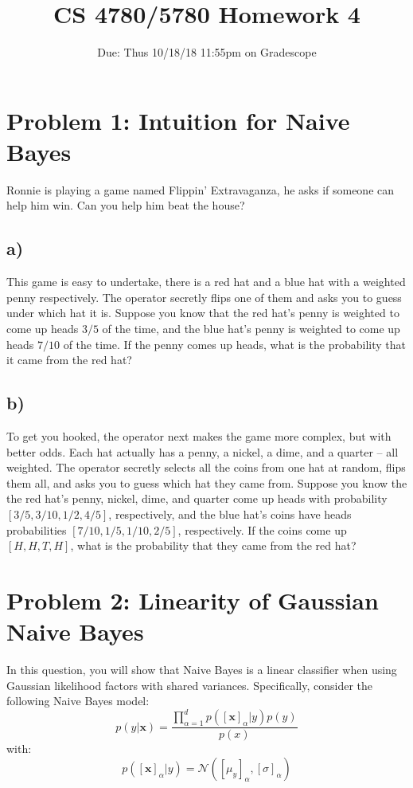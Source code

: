 \documentclass[a4paper]{article}
\title{CS 4780/5780 Homework 4\vspace{-10pt}}
\author{Due: Thus 10/18/18 11:55pm on Gradescope}
\date{\vspace{-20pt}}
\begin{document}
\maketitle

\section*{Problem 1: Intuition for Naive Bayes}
Ronnie is playing a game named Flippin' Extravaganza, he asks if someone can help him win. Can you help him beat the house?
\subsection*{a)}
This game is easy to undertake, there is a red hat and a blue hat with a weighted penny respectively. The operator secretly flips one of them and asks you to guess under which hat it is. Suppose you know that the red hat's penny is weighted to come up heads $3/5$ of the time, and the blue hat's penny is weighted to come up heads $7/10$ of the time. If the penny comes up heads, what is the probability that it came from the red hat?
\subsection*{b)}
To get you hooked, the operator next makes the game more complex, but with better odds. Each hat actually has a penny, a nickel, a dime, and a quarter -- all weighted. The operator secretly selects all the coins from one hat at random, flips them all, and asks you to guess which hat they came from. Suppose you know the the red hat's penny, nickel, dime, and quarter come up heads with probability $[3/5, 3/10, 1/2, 4/5]$, respectively, and the blue hat's coins have heads probabilities $[7/10, 1/5, 1/10, 2/5]$, respectively. If the coins come up $[H,H,T,H]$, what is the probability that they came from the red hat?

\section*{Problem 2: Linearity of Gaussian Naive Bayes}
In this question, you will show that Naive Bayes is a linear classifier when using Gaussian likelihood factors with shared variances. Specifically, consider the following Naive Bayes model:
$$p\left(y|\textbf{x}\right) = \frac{\prod^{d}_{\alpha=1}p\left([\textbf{x}]_{\alpha}|y\right)p\left(y\right)}{p\left(x\right)}$$
with:
$$p\left([\textbf{x}]_{\alpha}|y\right) = \mathcal{N}\left(\left[\mu_y\right]_{\alpha}, \left[\sigma\right]_{\alpha}\right)$$
\end{document}
